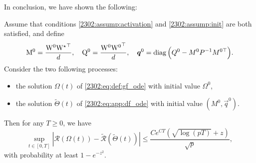 In conclusion, we have shown the following:
\begin{theorem}\label{2302:thm:app:mf_approx_bound}
    Assume that conditions \ref{2302:assump:activation} and \ref{2302:assump:init} are both satisfied, and define
    \begin{equation}
       \mathrm{M^0} = \frac{\mathrm{W}^{0}{\mathrm{W}^{\star}}^{\top}}{d},\quad  \mathrm{Q^0} = \frac{\mathrm{W}^{0}{\mathrm{W}^{0}}^{\top}}{d},\quad  {\boldsymbol{q}}^0 = \operatorname{diag}{\left(Q^0 - M^0 P^{-1} M^{0\top}\right)}.
    \end{equation}
    Consider the two following processes:
    \begin{itemize}
        \item the solution $\Omega(t)$ of \eqref{2302:eq:def:gf_ode} with initial value $\Omega^0$,
        \item the solution $\tilde\Theta(t)$ of \eqref{2302:eq:app:df_ode} with initial value $(M^0, \vec{q}^0)$.
    \end{itemize}
    Then for any $T \geq 0$, we have
    \begin{equation}
        \sup_{t \in [0, T]} \left|\mathcal{R}(\Omega(t)) - \tilde{\mathcal{R}}(\tilde\Theta(t)) \right| \leq \frac{Ce^{CT} \left(\sqrt{\log(pT)} + z \right)}{\sqrt{p}},
    \end{equation}
     with probability at least $1 - e^{-z^2}$.
\end{theorem}

